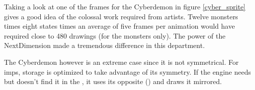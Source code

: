 \par
Taking a look at one of the frames for the Cyberdemon in figure \ref{cyber_sprite} gives a good idea of the colossal work required from artists. Twelve monsters times eight states times an average of five frames per animation would have required close to 480 drawings (for the monsters only). The power of the NextDimension made a tremendous difference in this department.\\
\par
The Cyberdemon however is an extreme case since it is not symmetrical. For imps, storage is optimized to take advantage of its symmetry. If the engine needs  but doesn't find it in the , it uses its opposite () and draws it mirrored.\\ 
\par
{}




\begin{figure}[H] \centering
{}
\end{figure}
\par
{}\\
\par 
{}





